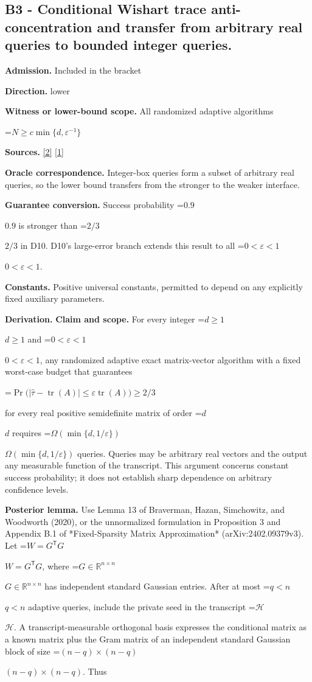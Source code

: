 \documentclass[10pt,a4paper]{article}
\newcommand{\AtlasMath}[1]{\par\begingroup\centering\setbox0=\hbox{$\displaystyle #1$}\ifdim\wd0>1.4\linewidth\typeout{ATLAS WIDE FORMULA: \the\wd0}\fi\ifdim\wd0>\linewidth\resizebox{\linewidth}{!}{\box0}\else\box0\fi\par\endgroup}
\newcommand{\AtlasInlineMath}[1]{\begingroup\setbox0=\hbox{$#1$}\ifdim\wd0>.4\linewidth\endgroup\AtlasMath{#1}\else\endgroup$#1$\fi}
\begin{document}
\subsection{B3 - Conditional Wishart trace anti-concentration and transfer from arbitrary real queries to bounded integer queries.}
\textbf{Admission.} Included in the bracket

\textbf{Direction.} lower

\textbf{Witness or lower-bound scope.} All randomized adaptive algorithms

\AtlasMath{N\ge c\min\{d,\varepsilon^{-1}\}}
\textbf{Sources.} \href{https://arxiv.org/pdf/2402.09379v3}{[2]} \href{https://proceedings.mlr.press/v125/braverman20a/braverman20a.pdf}{[1]}

\textbf{Oracle correspondence.} Integer-box queries form a subset of arbitrary real queries, so the lower bound transfers from the stronger to the weaker interface.

\textbf{Guarantee conversion.} Success probability \AtlasInlineMath{0.9} is stronger than \AtlasInlineMath{2/3} in D10. D10's large-error branch extends this result to all \AtlasInlineMath{0<\varepsilon<1}.

\textbf{Constants.} Positive universal constants, permitted to depend on any explicitly fixed auxiliary parameters.

\textbf{Derivation.} \textbf{Claim and scope.} For every integer \AtlasInlineMath{d\ge1} and \AtlasInlineMath{0<\varepsilon<1}, any randomized adaptive exact matrix-vector algorithm with a fixed worst-case budget that guarantees

\AtlasMath{\Pr\bigl(|\widehat\tau-\operatorname{tr}(A)|\le\varepsilon\operatorname{tr}(A)\bigr)\ge2/3}

for every real positive semidefinite matrix of order \AtlasInlineMath{d} requires \AtlasInlineMath{\Omega(\min\{d,1/\varepsilon\})} queries. Queries may be arbitrary real vectors and the output any measurable function of the transcript. This argument concerns constant success probability; it does not establish sharp dependence on arbitrary confidence levels.

\textbf{Posterior lemma.} Use Lemma 13 of Braverman, Hazan, Simchowitz, and Woodworth (2020), or the unnormalized formulation in Proposition 3 and Appendix B.1 of *Fixed-Sparsity Matrix Approximation* (arXiv:2402.09379v3). Let \AtlasInlineMath{W=G^{\mathsf T}G}, where \AtlasInlineMath{G\in\mathbb R^{n\times n}} has independent standard Gaussian entries. After at most \AtlasInlineMath{q<n} adaptive queries, include the private seed in the transcript \AtlasInlineMath{\mathcal H}. A transcript-measurable orthogonal basis expresses the conditional matrix as a known matrix plus the Gram matrix of an independent standard Gaussian block of size \AtlasInlineMath{(n-q)\times(n-q)}. Thus
\end{document}
